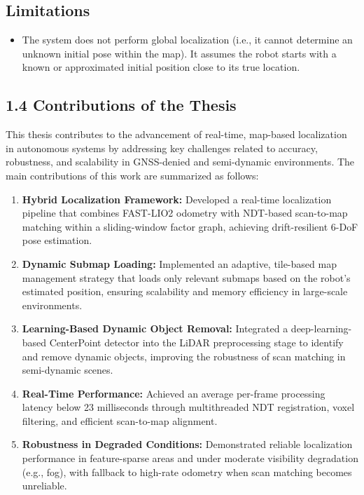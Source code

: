 \subsection{Limitations}
\begin{itemize}
	\item The system does not perform global localization (i.e., it cannot determine an unknown initial pose within the map). It assumes the robot starts with a known or approximated initial position close to its true location.
\end{itemize}
\subsection*{1.4 Contributions of the Thesis}

This thesis contributes to the advancement of real-time, map-based localization in autonomous systems by addressing key challenges related to accuracy, robustness, and scalability in GNSS-denied and semi-dynamic environments. The main contributions of this work are summarized as follows:

\begin{enumerate}
	\item \textbf{Hybrid Localization Framework:}  
	Developed a real-time localization pipeline that combines FAST-LIO2 odometry with NDT-based scan-to-map matching within a sliding-window factor graph, achieving drift-resilient 6-DoF pose estimation.
	
	\item \textbf{Dynamic Submap Loading:}  
	Implemented an adaptive, tile-based map management strategy that loads only relevant submaps based on the robot’s estimated position, ensuring scalability and memory efficiency in large-scale environments.
	
	\item \textbf{Learning-Based Dynamic Object Removal:}  
	Integrated a deep-learning-based CenterPoint detector into the LiDAR preprocessing stage to identify and remove dynamic objects, improving the robustness of scan matching in semi-dynamic scenes.
	
	\item \textbf{Real-Time Performance:}  
	Achieved an average per-frame processing latency below 23 milliseconds through multithreaded NDT registration, voxel filtering, and efficient scan-to-map alignment.
	
	\item \textbf{Robustness in Degraded Conditions:}  
	Demonstrated reliable localization performance in feature-sparse areas and under moderate visibility degradation (e.g., fog), with fallback to high-rate odometry when scan matching becomes unreliable.
\end{enumerate}



